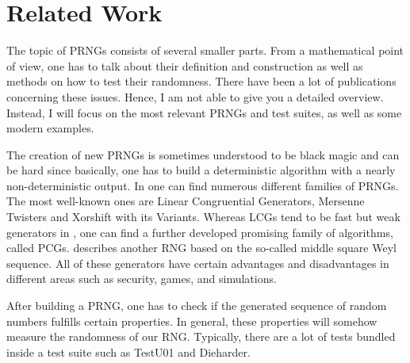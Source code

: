 \documentclass{stdlocal}
\begin{document}
  \section{Related Work} %
  \label{sec:related_work}
    The topic of PRNGs consists of several smaller parts.
    From a mathematical point of view, one has to talk about their definition and construction as well as methods on how to test their randomness.
    There have been a lot of publications concerning these issues.
    Hence, I am not able to give you a detailed overview.
    Instead, I will focus on the most relevant PRNGs and test suites, as well as some modern examples.

    The creation of new PRNGs is sometimes understood to be black magic and can be hard since basically, one has to build a deterministic algorithm with a nearly non-deterministic output.
    In \cite{kneusel2018} one can find numerous different families of PRNGs.
    The most well-known ones are Linear Congruential Generators, Mersenne Twisters and Xorshift with its Variants.
    Whereas LCGs tend to be fast but weak generators in \cite{oneill2014}, one can find a further developed promising family of algorithms, called PCGs.
    \cite{widynski2019} describes another RNG based on the so-called middle square Weyl sequence.
    All of these generators have certain advantages and disadvantages in different areas such as security, games, and simulations.

    After building a PRNG, one has to check if the generated sequence of random numbers fulfills certain properties.
    In general, these properties will somehow measure the randomness of our RNG.
    Typically, there are a lot of tests bundled inside a test suite such as TestU01 and Dieharder.
\end{document}
